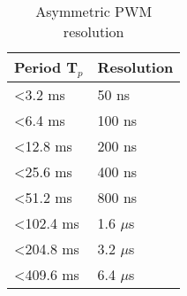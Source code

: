 \begin{table}[H]
\centering
\begin{tabular}{|l|l|}
\hline
\rowcolor[HTML]{34CDF9} 
\textbf{Period T$_p$} & \textbf{Resolution} \\ \hline
\textless 3.2 ms   & 50 ns              \\
\textless 6.4 ms   & 100 ns              \\
\textless 12.8 ms  & 200 ns              \\
\textless 25.6 ms  & 400 ns              \\
\textless 51.2 ms  & 800 ns              \\
\textless 102.4 ms & 1.6 $\mu$s              \\
\textless 204.8 ms & 3.2 $\mu$s              \\
\textless 409.6 ms & 6.4 $\mu$s              \\ \hline
\end{tabular}
\caption{Asymmetric PWM resolution}
\end{table}
